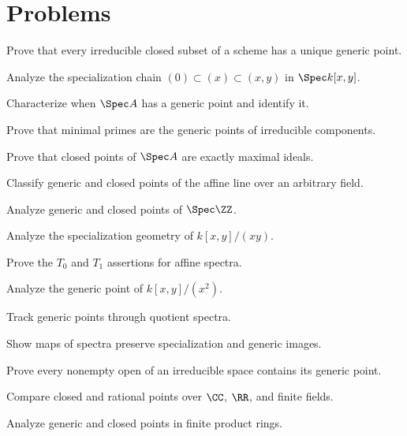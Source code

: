 \section{Problems}
\ifdefined\FullProblemDossiers

\else
\begin{problem}
Prove that every irreducible closed subset of a scheme has a unique generic point.
\end{problem}
\begin{problem}
Analyze the specialization chain $(0)\subset(x)\subset(x,y)$ in $\Spec k[x,y]$.
\end{problem}
\begin{problem}
Characterize when $\Spec A$ has a generic point and identify it.
\end{problem}
\begin{problem}
Prove that minimal primes are the generic points of irreducible components.
\end{problem}
\begin{problem}
Prove that closed points of $\Spec A$ are exactly maximal ideals.
\end{problem}
\begin{problem}
Classify generic and closed points of the affine line over an arbitrary field.
\end{problem}
\begin{problem}
Analyze generic and closed points of $\Spec\ZZ$.
\end{problem}
\begin{problem}
Analyze the specialization geometry of $k[x,y]/(xy)$.
\end{problem}
\begin{problem}
Prove the $T_0$ and $T_1$ assertions for affine spectra.
\end{problem}
\begin{problem}
Analyze the generic point of $k[x,y]/(x^2)$.
\end{problem}
\begin{problem}
Track generic points through quotient spectra.
\end{problem}
\begin{problem}
Show maps of spectra preserve specialization and generic images.
\end{problem}
\begin{problem}
Prove every nonempty open of an irreducible space contains its generic point.
\end{problem}
\begin{problem}
Compare closed and rational points over $\CC$, $\RR$, and finite fields.
\end{problem}
\begin{problem}
Analyze generic and closed points in finite product rings.
\end{problem}
\fi

